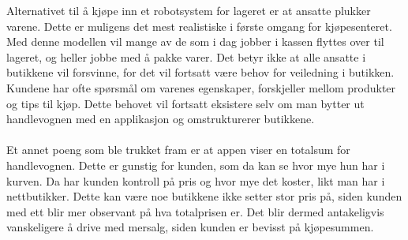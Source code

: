 \noindent Alternativet til å kjøpe inn et robotsystem for lageret er at ansatte plukker varene. Dette er muligens det mest realistiske i første omgang for kjøpesenteret. Med denne modellen vil mange av de som i dag jobber i kassen flyttes over til lageret, og heller jobbe med å pakke varer. Det betyr ikke at alle ansatte i butikkene vil forsvinne, for det vil fortsatt være behov for veiledning i butikken. Kundene har ofte spørsmål om varenes egenskaper, forskjeller mellom produkter og tips til kjøp. Dette behovet vil fortsatt eksistere selv om man bytter ut handlevognen med en applikasjon og omstrukturerer butikkene.
\\\\
Et annet poeng som ble trukket fram er at appen viser en totalsum for handlevognen. Dette er gunstig for kunden, som da kan se hvor mye hun har i kurven. Da har kunden kontroll på pris og hvor mye det koster, likt man har i nettbutikker. Dette kan være noe butikkene ikke setter stor pris på, siden kunden med ett blir mer observant på hva totalprisen er. Det blir dermed antakeligvis vanskeligere å drive med mersalg, siden kunden er bevisst på kjøpesummen. 






